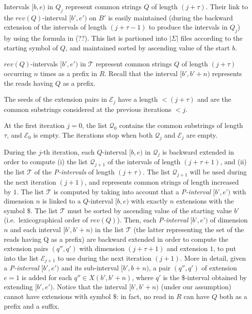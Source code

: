 \documentclass[11pt]{article}
\newcommand{\ie}{i.e.~}
\begin{document}
Intervals $[b,e)$ in $Q_j$ represent common strings $Q$ of length $(j+\tau)$.
Their link to the $rev(Q)$-interval $[b',e')$ on $B'$ is easily maintained (during the backward extension of the intervals of length $(j+\tau-1)$ to produce the intervals in $Q_j$) by using the formula in (??). This list is partioned into $|\Sigma|$ files according to the starting symbol of $Q$, and maintained sorted by ascending value of the start $b$.

$rev(Q)$-intervals $[b',e')$ in $\mathcal{T}$ represent common strings $Q$ of length $(j+\tau)$ occurring $n$ times as a prefix in $R$. Recall that the interval $[b',b'+n)$ represents the reads having $Q$ as a prefix.

The seeds of the extension pairs in $\mathcal{E}_j$
have a length $< (j+\tau)$ and are the common substrings considered at the previous iterations $< j$.

At the first iteration $j=0$, the list $\mathcal{Q}_0$ contains the common substrings of length $\tau$, and $\mathcal{E}_0$ is empty. The iterations stop when both $\mathcal{Q}_j$ and $\mathcal{E}_j$ are empty.

During the $j$-th iteration, each $Q$-interval $[b, e)$ in $\mathcal{Q}_j$ is backward extended in order to compute (i) the list $\mathcal{Q}_{j+1}$ of the intervals of length $(j+\tau+1)$, and (ii) the list $\mathcal{T}$ of the \emph{P-intervals} of length $(j+\tau)$.
The list $\mathcal{Q}_{j+1}$ will be used during the next iteration $(j+1)$, and represents common strings of length increased by $1$. The list $\mathcal{T}$ is computed by taking into account that a \emph{P-interval} $[b’, e’)$ with dimension $n$ is linked to a $Q$-interval $[b, e)$ with exactly $n$ extensions with the symbol $\$$. 
The list $\mathcal{T}$ must be sorted by ascending value of the starting value $b'$ (\ie lexicographical order of $rev(Q)$). Then, each \emph{P-interval} $[b’, e’)$ of dimension $n$ and each interval $[b’, b’+n)$ in the list $\mathcal{T}$ (the latter representing the set of the reads having Q as a prefix) are backward extended in order to compute the extension pairs $(q'', q')$ with dimension $(j+\tau+1)$ and extension $1$, to put into the list $\mathcal{E}_{j+1}$ to use during the next iteration $(j+1)$. More in detail, given a \emph{P-interval} $[b',e')$ and its sub-interval $[b',b+n)$, a pair $(q'',q')$ of extension $e=1$ is added for each $q'' \in X(b',b'+n)$, where $q'$ is the $\$$-interval obtained by extending $[b',e')$. Notice that the interval $[b’, b’+n)$ (under our assumption) cannot have extensions with symbol $\$$: in fact, no read in $R$ can have $Q$ both as a prefix and a suffix.
\end{document}
